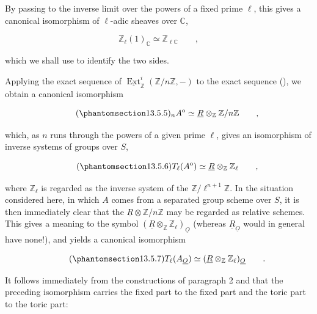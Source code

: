 \noindent
By passing to the inverse limit over the powers of a fixed prime
$\ell$, this gives a canonical isomorphism of $\ell$-adic sheaves over
$\mathbb C$,

\begin{equation*}
 \mathbb Z_\ell(1)_{\mathbb C}\simeq\mathbb Z_{\ell\mathbb C}
 \qquad ,
\end{equation*}

\noindent
which we shall use to identify the two sides.

Applying the exact sequence of
$\underline{\operatorname{Ext}}^i_{\mathbb Z}
(\mathbb Z/n\mathbb Z,-)$ to the exact sequence (), we obtain a
canonical isomorphism

\begin{equation}\tag{\SGARefTarget{sga7.sga7i.eix.n13-5-5}{13.5.5}}
 {}_nA^{\mathrm o}\simeq
 \underline R\otimes_{\mathbb Z}\mathbb Z/n\mathbb Z
 \qquad ,
\end{equation}

\noindent
which, as $n$ runs through the powers of a given prime $\ell$, gives an
isomorphism of inverse systems of groups over $S$,

\begin{equation}\tag{\SGARefTarget{sga7.sga7i.eix.n13-5-6}{13.5.6}}
 T_\ell(A^{\mathrm o})\simeq
 \underline R\otimes_{\mathbb Z}\mathbb Z_\ell
 \qquad ,
\end{equation}

\noindent
where $\mathbb Z_\ell$ is regarded as the inverse system of the
$\mathbb Z/\ell^{n+1}\mathbb Z$.  In the situation considered here, in
which $A$ comes from a separated group scheme over $S$, it is then
immediately clear that the
$\underline R\otimes\mathbb Z/n\mathbb Z$ may be regarded as relative
schemes.  This gives a meaning to the symbol
$(\underline R\otimes_{\mathbb Z}\mathbb Z_\ell)_{\underline O}$
(whereas $\underline R_{\underline O}$ would in general have none!), and yields a
canonical isomorphism

\begin{equation}\tag{\SGARefTarget{sga7.sga7i.eix.n13-5-7}{13.5.7}}
 T_\ell(A_{\underline O})\simeq
 (\underline R\otimes_{\mathbb Z}\mathbb Z_\ell)_{\underline O}
 \qquad .
\end{equation}

\noindent
It follows immediately from the constructions of paragraph 2 and 
that the preceding isomorphism carries the fixed part to the fixed part
and the toric part to the toric part:

